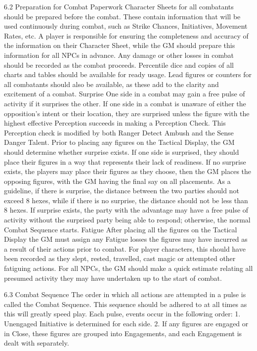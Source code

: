 \documentclass[a4paper]{article}
\begin{document}
\begin{multicols}{3}
6.2 Preparation for Combat
Paperwork
Character Sheets for all combatants should be
prepared before the combat. These contain information that will be used continuously during combat, such as Strike Chances, Initiatives, Movement
Rates, etc. A player is responsible for ensuring the
completeness and accuracy of the information on
their Character Sheet, while the GM should prepare
this information for all NPCs in advance. Any
damage or other losses in combat should be recorded as the combat proceeds. Percentile dice and
copies of all charts and tables should be available
for ready usage. Lead figures or counters for all
combatants should also be available, as these add
to the clarity and excitement of a combat.
Surprise
One side in a combat may gain a free pulse of
activity if it surprises the other. If one side in a
combat is unaware of either the opposition’s intent
or their location, they are surprised unless the
figure with the highest effective Perception succeeds in making a Perception Check. This Perception check is modified by both Ranger Detect
Ambush and the Sense Danger Talent.
Prior to placing any figures on the Tactical Display, the GM should determine whether surprise
exists. If one side is surprised, they should place
their figures in a way that represents their lack of
readiness. If no surprise exists, the players may
place their figures as they choose, then the GM
places the opposing figures, with the GM having
the final say on all placements. As a guideline, if
there is surprise, the distance between the two
parties should not exceed 8 hexes, while if there is
no surprise, the distance should not be less than 8
hexes.
If surprise exists, the party with the advantage may
have a free pulse of activity without the surprised
party being able to respond; otherwise, the normal
Combat Sequence starts.
Fatigue
After placing all the figures on the Tactical Display
the GM must assign any Fatigue losses the figures
may have incurred as a result of their actions prior
to combat. For player characters, this should have
been recorded as they slept, rested, travelled, cast
magic or attempted other fatiguing actions. For all
NPCs, the GM should make a quick estimate relating all presumed activity they may have undertaken up to the start of combat.

6.3 Combat Sequence
The order in which all actions are attempted in a
pulse is called the Combat Sequence. This sequence should be adhered to at all times as this will
greatly speed play. Each pulse, events occur in the
following order:
1. Unengaged Initiative is determined for each
side.
2. If any figures are engaged or in Close, these
figures are grouped into Engagements, and each
Engagement is dealt with separately.


\end{multicols}
\end{document}
